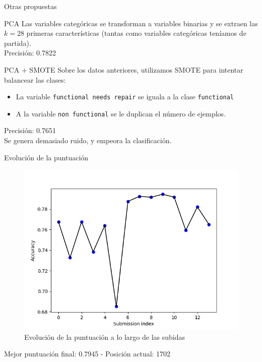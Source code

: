 \begin{frame}{Otras propuestas}
  \begin{block}{PCA}
    Las variables categóricas se transforman a variables binarias y se
    extraen las $k = 28$ primeras características (tantas como
    variables categóricas teníamos de partida). \\

    Precisión: 0.7822
  \end{block}

  \begin{block}{PCA + SMOTE}
    Sobre los datos anteriores, utilizamos SMOTE para intentar balancear
    las clases:
    \begin{itemize}
    \item La variable \texttt{functional needs repair} se iguala a la
      clase \texttt{functional}
    \item A la variable \texttt{non functional} se le duplican el
      número de ejemplos.
    \end{itemize}
    Precisión: 0.7651\\

    Se genera demasiado ruido, y empeora la clasificación.
  \end{block}
\end{frame}

\begin{frame}{Evolución de la puntuación}
  \begin{figure}
    \centering
    \includegraphics[height=.6\textheight]{figures/evolutiontrees}
    \caption{Evolución de la puntuación a lo largo de las subidas}
  \end{figure}
  Mejor puntuación final: 0.7945 - Posición actual: 1702
\end{frame}
